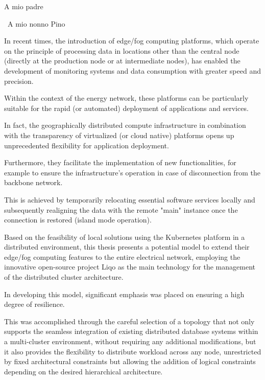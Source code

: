 \documentclass[%
	corpo=11pt,
    twoside,
    stile=classica,
    oldstyle,
    tipotesi=custom,
    greek,
    evenboxes,
]{toptesi}
\begin{document}
\english


\ifclassica%
{\begin{dedica}
    A mio padre

    \textdagger\ A mio nonno Pino
\end{dedica}

\sommario%
In recent times, the introduction of edge/fog computing platforms, which operate on the principle of processing data in locations other than the central node (directly at the production node or at intermediate nodes), has enabled the development of monitoring systems and data consumption with greater speed and precision.

Within the context of the energy network, these platforms can be particularly suitable for the rapid (or automated) deployment of applications and services.

In fact, the geographically distributed compute infrastructure in combination with the transparency of virtualized (or cloud native) platforms opens up unprecedented flexibility for application deployment. 

Furthermore, they facilitate the implementation of new functionalities, for example to ensure the infrastructure's operation in case of disconnection from the backbone network. 

This is achieved by temporarily relocating essential software services locally and subsequently realigning the data with the remote "main" instance once the connection is restored (island mode operation). 

Based on the feasibility of local solutions using the Kubernetes platform in a distributed environment, this thesis presents a potential model to extend their edge/fog computing features to the entire electrical network, employing the innovative open-source project Liqo as the main technology for the management of the distributed cluster architecture.

In developing this model, significant emphasis was placed on ensuring a high degree of resilience. 

This was accomplished through the careful selection of a topology that not only supports the seamless integration of existing distributed database systems within a multi-cluster environment, without requiring any additional modifications, but it also provides the flexibility to distribute workload across any node, unrestricted by fixed architectural constraints but allowing the addition of logical constraints depending on the desired hierarchical architecture.

}
\end{document}
